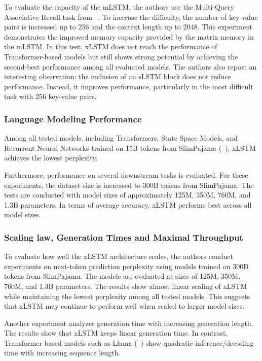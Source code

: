 \documentclass[a4paper,oneside,10pt,ngerman,english]{scrartcl}
\begin{document}
To evaluate the capacity of the mLSTM, the authors use the Multi-Query Associative Recall task from \citeauthor{arora2023zoologymeasuringimprovingrecall}~\cite{arora2023zoologymeasuringimprovingrecall}. To increase the difficulty, the number of key-value pairs is increased up to 256 and the context length up to 2048. This experiment demonstrates the improved memory capacity provided by the matrix memory in the mLSTM. In this test, xLSTM does not reach the performance of Transformer-based models but still shows strong potential by achieving the second-best performance among all evaluated models. The authors also report an interesting observation: the inclusion of an sLSTM block does not reduce performance. Instead, it improves performance, particularly in the most difficult task with 256 key-value pairs.

\subsubsection{Language Modeling Performance}
\label{sec:llmperformance}

Among all tested models, including Transformers, State Space Models, and Recurrent Neural Networks trained on 15B tokens from SlimPajama (\citeauthor{cerebras2023slimpajama}~\cite{cerebras2023slimpajama}), xLSTM achieves the lowest perplexity.

Furthermore, performance on several downstream tasks is evaluated. For these experiments, the dataset size is increased to 300B tokens from SlimPajama. The tests are conducted with model sizes of approximately 125M, 350M, 760M, and 1.3B parameters. In terms of average accuracy, xLSTM performs best across all model sizes.

\subsubsection{Scaling law, Generation Times and Maximal Throughput}
\label{sec:scalingperformance}

To evaluate how well the xLSTM architecture scales, the authors conduct experiments on next-token prediction perplexity using models trained on 300B tokens from SlimPajama. The models are evaluated at sizes of 125M, 350M, 760M, and 1.3B parameters. The results show almost linear scaling of xLSTM while maintaining the lowest perplexity among all tested models. This suggests that xLSTM may continue to perform well when scaled to larger model sizes.

Another experiment analyzes generation time with increasing generation length. The results show that xLSTM keeps linear generation time. In contrast, Transformer-based models such as Llama (\citeauthor{touvron2023llamaopenefficientfoundation}~\cite{touvron2023llamaopenefficientfoundation}) show quadratic inference/decoding time with increasing sequence length.
\end{document}
